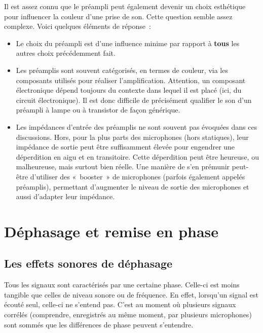 \documentclass[
]{book}
\providecommand{\tightlist}{%
  \setlength{\itemsep}{0pt}\setlength{\parskip}{0pt}}
\begin{document}
Il est assez connu que le préampli peut également devenir un choix esthétique pour influencer la couleur d'une prise de son. Cette question semble assez complexe. Voici quelques éléments de réponse~:

\begin{itemize}
\tightlist
\item
  Le choix du préampli est d'une influence minime par rapport à \textbf{tous} les autres choix précédemment fait.
\item
  Les préamplis sont souvent catégorisés, en termes de couleur, via les composants utilisés pour réaliser l'amplification. Attention, un composant électronique dépend toujours du contexte dans lequel il est placé (ici, du circuit électronique). Il est donc difficile de précisément qualifier le son d'un préampli à lampe ou à transistor de façon générique.
\item
  Les impédances d'entrée des préamplis ne sont souvent pas évoquées dans ces discussions. Hors, pour la plus parts des microphones (hors statiques), leur impédance de sortie peut être suffisamment élevée pour engendrer une déperdition en aigu et en transitoire. Cette déperdition peut être heureuse, ou malheureuse, mais surtout bien réelle. Une manière de s'en prémunir peut-être d'utiliser des «~booster~» de microphones (parfois également appelés préamplis), permettant d'augmenter le niveau de sortie des microphones et aussi d'adapter leur impédance.
\end{itemize}

\hypertarget{duxe9phasage-et-remise-en-phase}{%
\chapter{Déphasage et remise en phase}\label{duxe9phasage-et-remise-en-phase}}

\hypertarget{les-effets-sonores-de-duxe9phasage}{%
\section{Les effets sonores de déphasage}\label{les-effets-sonores-de-duxe9phasage}}

Tous les signaux sont caractérisés par une certaine phase. Celle-ci est moins tangible que celles de niveau sonore ou de fréquence. En effet, lorsqu'un signal est écouté seul, celle-ci ne s'entend pas. C'est au moment où plusieurs signaux corrélés (comprendre, enregistrés au même moment, par plusieurs microphones) sont sommés que les différences de phase peuvent s'entendre.
\end{document}
